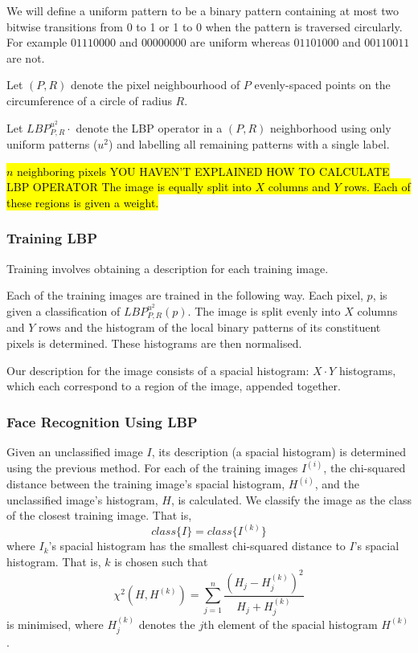 \documentclass{article}
\begin{document}
We will define a uniform pattern to be a binary pattern containing at most two bitwise transitions from 0 to 1 or 1 to 0 when the pattern is traversed circularly. For example $01110000$ and $00000000$ are uniform whereas $01101000$ and $00110011$ are not.

Let $(P, R)$ denote the pixel neighbourhood of $P$ evenly-spaced points on the circumference of a circle of radius $R$.

Let $LBP^{u^2}_{P,R}\cdot$ denote the LBP operator in a $(P, R)$ neighborhood using only uniform patterns ($u^2$) and labelling all remaining patterns with a single label.


\hl{$n$ neighboring pixels 
YOU HAVEN'T EXPLAINED HOW TO CALCULATE LBP OPERATOR
The image is equally split into $X$ columns and $Y$ rows. Each of these regions is given a weight.}
\subsubsection{Training LBP}
Training involves obtaining a description for each training image.

Each of the training images are trained in the following way. Each pixel, $p$, is given a classification of $LBP_{P,R}^{u^2}(p)$. The image is split evenly into $X$ columns and $Y$ rows and the histogram of the local binary patterns of its constituent pixels is determined. These histograms are then normalised.

Our description for the image consists of a spacial histogram: $X\cdot Y$ histograms, which each correspond to a region of the image, appended together.

\subsubsection{Face Recognition Using LBP}
Given an unclassified image $I$, its description (a spacial histogram) is determined using the previous method. For each of the training images $I^{(i)}$, the chi-squared distance between the training image's spacial histogram, $H^{(i)}$, and the unclassified image's histogram, $H$, is calculated.
We classify the image as the class of the closest training image. That is,
\begin{equation}
	class\{I\} = class\{I^{(k)}\}
\end{equation}
where $I_k$'s spacial histogram has the smallest chi-squared distance to $I$'s spacial histogram. That is, $k$ is chosen such that
\begin{equation}
	\chi^2(H, H^{(k)}) = \sum_{j=1}^{n}\frac{(H_j - H^{(k)}_j)^2}{H_j + H^{(k)}_j}
\end{equation}
is minimised, where $H^{(k)}_j$ denotes the $j$th element of the spacial histogram $H^{(k)}$.
\end{document}
